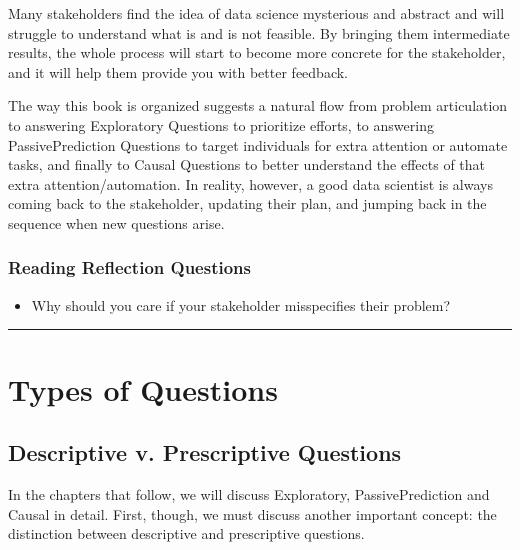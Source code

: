 \documentclass[letterpaper,10pt,english]{jupyterBook}
\begin{document}
\sphinxAtStartPar
Many stakeholders find the idea of data science mysterious and abstract and will struggle to understand what is and is not feasible. By bringing them intermediate results, the whole process will start to become more concrete for the stakeholder, and it will help them provide you with better feedback.

\sphinxAtStartPar
The way this book is organized suggests a natural flow from problem articulation to answering Exploratory Questions to prioritize efforts, to answering Passive\sphinxhyphen{}Prediction Questions to target individuals for extra attention or automate tasks, and finally to Causal Questions to better understand the effects of that extra attention/automation. In reality, however, a good data scientist is always coming back to the stakeholder, updating their plan, and jumping back in the sequence when new questions arise.


\section{Reading Reflection Questions}
\label{\detokenize{20_problems_to_questions/20_stakeholder_management:reading-reflection-questions}}\begin{itemize}
\item {} 
\sphinxAtStartPar
Why should you care if your stakeholder misspecifies their problem?

\end{itemize}


\bigskip\hrule\bigskip


\sphinxstepscope


\part{Types of Questions}

\sphinxstepscope


\chapter{Descriptive v. Prescriptive Questions}
\label{\detokenize{30_questions/05_descriptive_v_prescriptive:descriptive-v-prescriptive-questions}}\label{\detokenize{30_questions/05_descriptive_v_prescriptive::doc}}
\sphinxAtStartPar
In the chapters that follow, we will discuss Exploratory, Passive\sphinxhyphen{}Prediction and Causal in detail. First, though, we must discuss another important concept: the distinction between descriptive and prescriptive questions.
\end{document}
